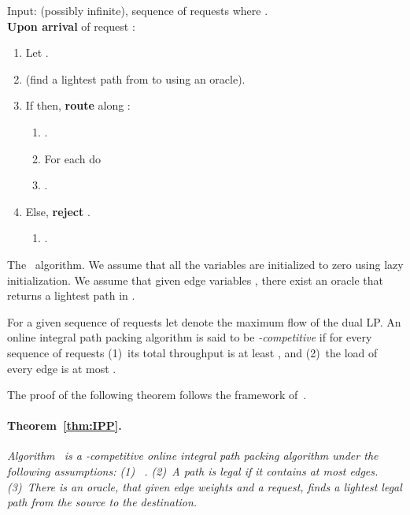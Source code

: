 \documentclass[11pt]{article}
\newcommand{\route}{\text{\sc{ipp}}}
\newenvironment{proof sketch}[1]{\noindent {\emph{Proof sketch of #1:}}}{\hfill \qed}
\begin{document}
\begin{algorithm}
    Input:  (possibly infinite), sequence of requests  where .
    \\
    \textbf{Upon arrival} of request :
        \begin{enumerate}
            \item Let .
            \item  (find a lightest path from  to  using an oracle).
            \item If  then, \textbf{route}  along :
            \begin{enumerate}
                    \item .
                    \item \label{step:xupdate}For each  do
                  
                  \item .
            \end{enumerate}
            \item Else, \textbf{reject} .
            \begin{enumerate}
              \item.
            \end{enumerate}
        \end{enumerate}
\caption{The \route\ algorithm.  We assume that all the
  variables are initialized to zero using lazy initialization. We assume that given edge variables , there exist an oracle that returns a lightest path in . }
  \label{fig:route}
\end{algorithm}


For a given sequence  of requests let 
denote the maximum flow of the dual LP.  An online integral
path packing algorithm is said to be
\emph{-competitive} if for every sequence
 of requests (1)~its total throughput is at least
, and (2)~the load of every edge is at
most .


\medskip
\noindent
The proof of the following theorem follows the framework of~\cite{BN09,BNsurvey}.

\paragraph{Theorem~\ref{thm:IPP}.}
\emph{ Algorithm \route\ is a -competitive online integral
  path packing algorithm under the following assumptions: (1)~ .  (2)~A path is legal if it contains at most  edges.
(3)~There is an oracle, that given edge weights and a
  request, finds a
  lightest legal path from the source to the destination.
}
\end{document}
